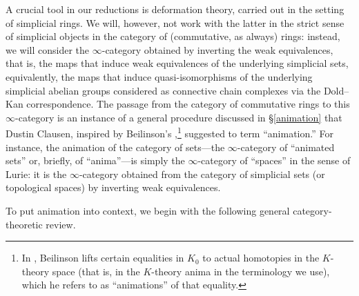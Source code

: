 A crucial tool in our reductions is deformation theory, carried out in the setting of simplicial rings. We will, however, not work with the latter in the strict sense of simplicial objects in the category of (commutative, as always) rings: instead, we will consider the $\infty$-category obtained by inverting the weak equivalences, that is, the maps that induce weak equivalences of the underlying simplicial sets, equivalently, the maps that induce quasi-isomorphisms of the underlying simplicial abelian groups considered as connective chain complexes via the Dold--Kan correspondence. The passage from the category of commutative rings to this $\infty$-category is an instance of a general procedure discussed in \S\ref{animation} that Dustin Clausen, inspired by Beilinson's \cite{Bei07},\footnote{In \cite{Bei07}, Beilinson lifts certain equalities in $K_0$ to actual homotopies in the $K$-theory space (that is, in the $K$-theory anima in the terminology we use), which he refers to as ``animations'' of that equality.} suggested to term ``animation.'' For instance, the animation of the category of sets---the $\infty$-category of ``animated sets'' or, briefly, of ``anima''---is simply the $\infty$-category of ``spaces'' in the sense of Lurie: it is the $\infty$-category obtained from the category of simplicial sets (or topological spaces) by inverting weak equivalences.






To put animation into context, we begin with the following general category-theoretic review.

